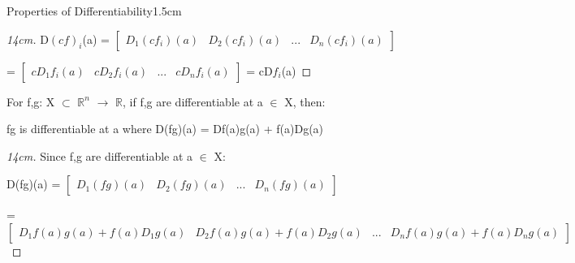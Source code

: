 \begin{ltheorem}{Properties of Differentiability}{1.5cm}
\begin{proof}[14cm]
                \hspace{0.5cm}
                D$(cf)_i$(a) =
                $
                \begin{bmatrix}
                    D_1(cf_i)(a)
                    & D_2(cf_i)(a)
                    & ...
                    & D_n(cf_i)(a)
                \end{bmatrix}
                $

                \hspace{2.3cm}
                = $
                \begin{bmatrix}
                    cD_1f_i(a)
                    & cD_2f_i(a)
                    & ...
                    & cD_nf_i(a)
                \end{bmatrix}
                $
                = cD$f_i$(a)
            \end{proof}

            \newpage

        \item For f,g: X $\subset$ $\mathbb{R}^n$ $\rightarrow$ $\mathbb{R}$,
            if f,g are differentiable at a $\in$ X, then:

            \hspace{0.5cm}
            fg is differentiable at a where D(fg)(a) = Df(a)g(a) + f(a)Dg(a)

            \begin{proof}[14cm]
                Since f,g are differentiable at a $\in$ X:

                \hspace{0.2cm}
                D(fg)(a) =
                $
                \begin{bmatrix}
                    D_1(fg)(a)
                    & D_2(fg)(a)
                    & ...
                    & D_n(fg)(a)
                \end{bmatrix}
                $

                \hspace{0.2cm}
                = $
                \begin{bmatrix}
                    \scriptstyle D_1f(a)g(a)+f(a)D_1g(a)
                    & \scriptstyle D_2f(a)g(a)+f(a)D_2g(a)
                    & \scriptstyle ...
                    & \scriptstyle D_nf(a)g(a)+f(a)D_ng(a)
                \end{bmatrix}
                $


\end{proof}
\end{ltheorem}
